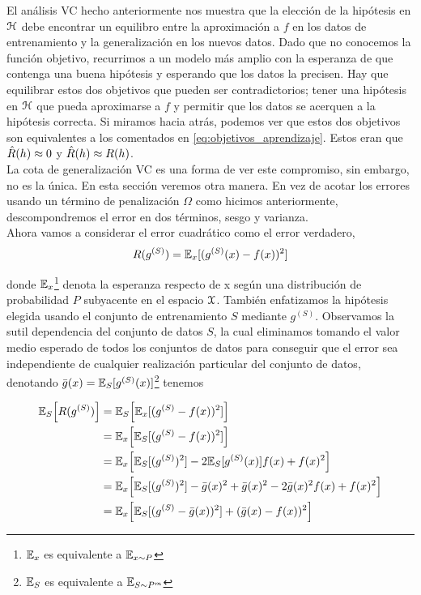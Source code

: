     El análisis VC hecho anteriormente nos muestra que la elección de la hipótesis en $\mathcal{H}$ debe encontrar un equilibro entre la aproximación a $f$ en los datos de entrenamiento y la generalización en los nuevos datos. Dado que no conocemos la función objetivo, recurrimos a un modelo más amplio con la esperanza de que contenga una buena hipótesis y esperando que los datos la precisen.  Hay que equilibrar estos dos objetivos que pueden ser contradictorios; tener una hipótesis en $\mathcal{H}$ que pueda aproximarse a $f$ y permitir que los datos se acerquen a la hipótesis correcta. Si miramos hacia atrás, podemos ver que estos dos objetivos son equivalentes a los comentados en  \eqref{eq:objetivos_aprendizaje}. Estos eran que $\hat{R}(h) \approx 0 $ y $\hat{R}(h) \approx R(h)$. \\
    
    La cota de generalización VC es una forma de ver este compromiso, sin embargo, no es la única. En esta sección veremos otra manera. En vez de acotar los errores usando un término de penalización $\Omega$ como hicimos anteriormente, descompondremos el error en dos términos, sesgo y varianza. \\
    
    Ahora vamos a considerar el error cuadrático como el error verdadero,
    \begin{equation}
        R(g^{(S)}) = \mathbb{E}_{x}[(g^{(S)}(x) - f(x))^2]
    \end{equation}
    
    \noindent donde $\mathbb{E}_x$\footnote{$\mathbb{E}_x$ es equivalente a $\mathbb{E}_{x \sim P}$}  denota la esperanza respecto de x según una distribución de probabilidad $P$ subyacente en el espacio $\mathcal{X}$. También enfatizamos la hipótesis elegida usando el conjunto de entrenamiento $S$ mediante $g^{(S)}$. Observamos la sutil dependencia del conjunto de datos $S$, la cual eliminamos tomando el valor medio esperado de todos los conjuntos de datos para conseguir que el error sea independiente de cualquier realización particular del conjunto de datos, denotando  $\Bar{g}(x) = \mathbb{E}_S[g^{(S)}(x)]$\footnote{$\mathbb{E}_S$ es equivalente a $\mathbb{E}_{S\sim P^m}$} tenemos
    
    \begin{equation}
        \begin{aligned}
            \mathbb{E}_S\Big[ R(g^{(S)}) \Big] &= \mathbb{E}_S \Big[ \mathbb{E}_x[(g^{(S)} - f(x))^2] \Big] \\
            &= \mathbb{E}_x \Big[ \mathbb{E}_S[(g^{(S)} - f(x))^2] \Big] \\
            &= \mathbb{E}_x \Big[ \mathbb{E}_S[(g^{(S)})^2] - 2\mathbb{E}_S[g^{(S)}(x)]f(x) + f(x)^2 \Big] \\
            &= \mathbb{E}_x \Big[ \mathbb{E}_S[(g^{(S)})^2] - \Bar{g}(x)^2 + \Bar{g}(x)^2 - 2\Bar{g}(x)^2f(x) + f(x)^2 \Big] \\
            &= \mathbb{E}_x \Big[ \mathbb{E}_S[(g^{(S)} - \Bar{g}(x))^2] + (\Bar{g}(x) - f(x))^2 \Big]
        \end{aligned}
    \end{equation}
    
